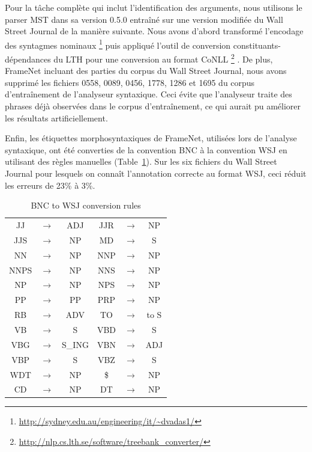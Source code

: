 Pour la tâche complète qui inclut l'identification des arguments, nous
utilisons le parser MST dans sa version 0.5.0 \citep{mcdonald2006multilingual}
entraîné sur une version modifiée du Wall Street Journal de la manière
suivante. Nous avons d'abord transformé l'encodage des syntagmes nominaux
\footnote{\url{http://sydney.edu.au/engineering/it/~dvadas1/}}
\citep{vadas2007adding} puis appliqué l'outil de conversion
constituants-dépendances du LTH pour une conversion au format CoNLL
\footnote{\url{http://nlp.cs.lth.se/software/treebank_converter/}}
\citep{johansson2007extended}. De plus, FrameNet incluant des parties du corpus
du Wall Street Journal, nous avons supprimé les fichiers 0558, 0089, 0456,
1778, 1286 et 1695 du corpus d'entraînement de l'analyseur syntaxique. Ceci
évite que l'analyseur traite des phrases déjà observées dans le corpus
d'entraînement, ce qui aurait pu améliorer les résultats artificiellement.

Enfin, les étiquettes morphosyntaxiques de FrameNet, utilisées lors de
l'analyse syntaxique, ont été converties de la convention BNC à la convention
WSJ en utilisant des règles manuelles (Table~\ref{table:tagset_rules}). Sur les
six fichiers du Wall Street Journal pour lesquels on connaît l'annotation
correcte au format WSJ, ceci réduit les erreurs de 23\% à 3\%.

\begin{table}[ht]
    \centering
    \begin{tabular}{ccc|ccc}
        \toprule
        JJ   &$\to$& ADJ    & JJR  &$\to$& NP     \\
        JJS  &$\to$& NP     & MD   &$\to$& S      \\
        NN   &$\to$& NP     & NNP  &$\to$& NP     \\
        NNPS &$\to$& NP     & NNS  &$\to$& NP     \\
        NP   &$\to$& NP     & NPS  &$\to$& NP     \\
        PP   &$\to$& PP     & PRP  &$\to$& NP     \\  
        RB   &$\to$& ADV    & TO   &$\to$& to S   \\
        VB   &$\to$& S      & VBD  &$\to$& S      \\
        VBG  &$\to$& S\_ING & VBN  &$\to$& ADJ    \\
        VBP  &$\to$& S      & VBZ  &$\to$& S      \\
        WDT  &$\to$& NP     & \$   &$\to$& NP     \\  
        CD   &$\to$& NP     & DT   &$\to$& NP     \\
        \bottomrule
    \end{tabular}
    \caption{\protect\centering\label{table:tagset_rules}BNC to WSJ conversion rules}
\end{table}

